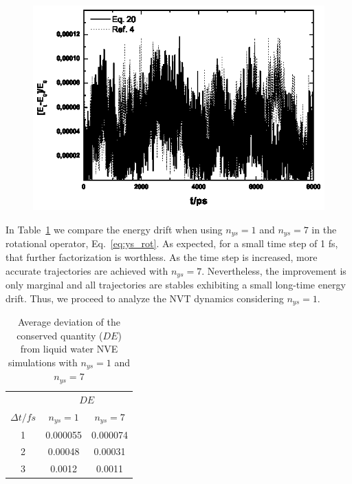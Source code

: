 \documentclass[aip,jcp,reprint,amsmath,amssymb]{revtex4-1}
\begin{document}
\begin{figure}[!h]
\centering
\includegraphics{millerourmd}
\label{fig:miller1fs}
\end{figure}

In Table~\ref{table:nve} we compare the energy drift when using $n_{ys} = 1$ and $n_{ys} = 7$ in the rotational operator, Eq.~\ref{eq:ys_rot}. As expected, for a small time step of 1 fs, that further factorization is worthless. As the time step is increased, more accurate trajectories are achieved with $n_{ys} = 7 $. Nevertheless, the improvement is only marginal and all trajectories are stables exhibiting a small long-time energy drift. Thus, we proceed to analyze the NVT dynamics considering $n_{ys} = 1$.

\begin{table}[h]
\setlength{\tabcolsep}{7pt}
\caption{Average deviation of the conserved quantity ($DE$) from liquid water NVE simulations with $n_{ys}=1$ and $n_{ys}=7$  }
\centering %
\begin{tabular}{| c  c  c |}  
\hline
&  \multicolumn{2}{c|}{ $D E$ }\\
\cline{2-3}
$\Delta t/fs$ &$n_{ys}=1$ &$n_{ys}=7$ \\
\hline %
 1 & 0.000055 & 0.000074\\
 2 & 0.00048 & 0.00031 \\
 3 & 0.0012 & 0.0011\\
 \hline
\end{tabular}
\label{table:nve}
\end{table}
\end{document}
